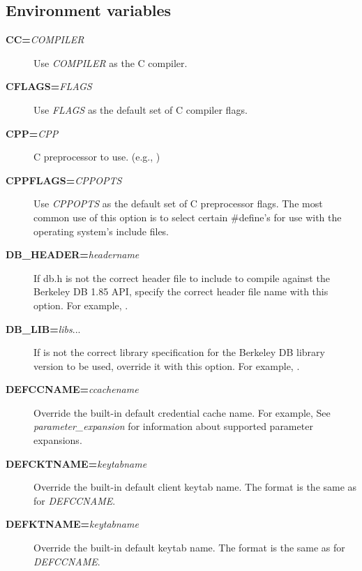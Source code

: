 \documentclass[letterpaper,10pt,english]{sphinxmanual}
\begin{document}
\subsection{Environment variables}
\label{build/options2configure:environment-variables}\begin{description}
\item[{\textbf{CC=}\emph{COMPILER}}] \leavevmode
Use \emph{COMPILER} as the C compiler.

\item[{\textbf{CFLAGS=}\emph{FLAGS}}] \leavevmode
Use \emph{FLAGS} as the default set of C compiler flags.

\item[{\textbf{CPP=}\emph{CPP}}] \leavevmode
C preprocessor to use. (e.g., )

\item[{\textbf{CPPFLAGS=}\emph{CPPOPTS}}] \leavevmode
Use \emph{CPPOPTS} as the default set of C preprocessor flags.  The
most common use of this option is to select certain \#define's for
use with the operating system's include files.

\item[{\textbf{DB\_HEADER=}\emph{headername}}] \leavevmode
If db.h is not the correct header file to include to compile
against the Berkeley DB 1.85 API, specify the correct header file
name with this option. For example, .

\item[{\textbf{DB\_LIB=}\emph{libs}...}] \leavevmode
If  is not the correct library specification for the
Berkeley DB library version to be used, override it with this
option. For example, .

\item[{\textbf{DEFCCNAME=}\emph{ccachename}}] \leavevmode
Override the built-in default credential cache name.
For example, 
See \emph{parameter\_expansion} for information about supported
parameter expansions.

\item[{\textbf{DEFCKTNAME=}\emph{keytabname}}] \leavevmode
Override the built-in default client keytab name.
The format is the same as for \emph{DEFCCNAME}.

\item[{\textbf{DEFKTNAME=}\emph{keytabname}}] \leavevmode
Override the built-in default keytab name.
The format is the same as for \emph{DEFCCNAME}.


\end{description}
\end{document}
